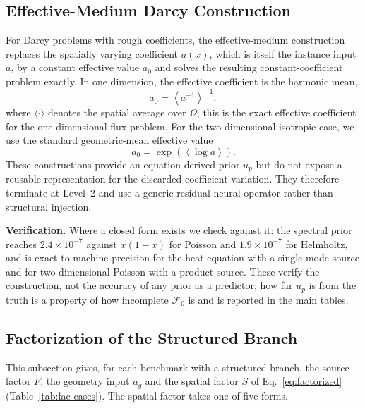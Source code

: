\documentclass{article}
\begin{document}
\subsection{Effective-Medium Darcy Construction}
\label{app:darcy-effective-medium}

For Darcy problems with rough coefficients, the effective-medium construction
replaces the spatially varying coefficient \(a(x)\), which is itself the instance input \(a\), by a constant effective value
$a_0$ and solves the resulting constant-coefficient problem exactly. In one
dimension, the effective coefficient is the harmonic mean,
\begin{equation}
a_0
=
\left\langle a^{-1}\right\rangle^{-1},
\label{eq:app-darcy-harmonic}
\end{equation}
where \(\langle\cdot\rangle\) denotes the spatial average over \(\Omega\); this is the exact effective coefficient for the one-dimensional flux problem.
For the two-dimensional isotropic case, we use the standard geometric-mean
effective value
\begin{equation}
a_0
=
\exp\!\left(\left\langle\log a\right\rangle\right).
\label{eq:app-darcy-geometric}
\end{equation}
These constructions provide an equation-derived prior $u_p$ but do not expose a
reusable representation for the discarded coefficient variation. They therefore
terminate at Level~2 and use a generic residual neural operator rather than structural
injection.

\textbf{Verification.}
Where a closed form exists we check against it: the spectral prior reaches $2.4\times10^{-7}$ against
$x(1-x)$ for Poisson and $1.9\times10^{-7}$ for Helmholtz, and is exact to machine precision for the
heat equation with a single mode source and for two-dimensional Poisson with a product source. These
verify the construction, not the accuracy of any prior as a predictor; how far $u_p$ is from the truth
is a property of how incomplete $\mathcal{F}_0$ is and is reported in the main tables.

\subsection{Factorization of the Structured Branch}
\label{app:phi-factorization}

This subsection gives, for each benchmark with a structured branch, the source factor $F$,
the geometry input $a_g$ and the spatial factor $S$ of Eq.~\ref{eq:factorized}
(Table~\ref{tab:fac-cases}). The spatial factor takes one of five forms.
\end{document}
